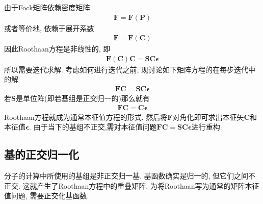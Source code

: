 由于Fock矩阵依赖密度矩阵
\begin{align}
	\mathbf{F=F(P)}
\end{align}
或者等价地, 
依赖于展开系数
\begin{align}
	\mathbf{F=F(C)}
\end{align}
因此Roothaan方程是非线性的, 
即
\begin{align}
	\mathbf{F(C)C=SC}\bm{\epsilon}
\end{align}
所以需要迭代求解. 
考虑如何进行迭代之前, 
现讨论如下矩阵方程的在每步迭代中的解
\begin{align}
	\mathbf{FC=SC}\bm{\epsilon}
\end{align}
若$\mathbf{S}$是单位阵(即若基组是正交归一的)那么就有
\begin{align}
	\mathbf{FC=C}\bm{\epsilon}
\end{align}
Roothaan方程就成为通常本征值方程的形式, 
然后将$\mathbf{F}$对角化即可求出本征矢$\mathbf{C}$和本征值$\bm{\epsilon}$. 由于当下的基组不正交,需对本征值问题$\mathbf{FC=SC}\bm{\epsilon}$进行重构.
\subsection{基的正交归一化}
分子的计算中所使用的基组是非正交归一基. 
基函数确实是归一的, 
但它们之间不正交. 
这就产生了Roothaan方程中的重叠矩阵. 
为将Roothaan写为通常的矩阵本征值问题, 
需要正交化基函数.


